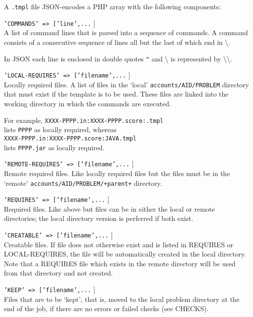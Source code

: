 \documentclass[12pt]{article}
\newenvironment{indpar}[1][0.4in]%
	{\begin{list}{}%
		     {\setlength{\itemsep}{0in}%
		      \setlength{\topsep}{0in}%
		      \setlength{\parsep}{1ex}%
		      \setlength{\labelwidth}{#1}%
		      \setlength{\leftmargin}{#1}%
		      \addtolength{\leftmargin}{\labelsep}}%
	 \item}%
	{\end{list}}
\newenvironment{itemlist}[1][0.2in]%
	{\begin{list}{}{\setlength{\labelwidth}{#1}%
		        \setlength{\leftmargin}{\labelwidth}%
		        \addtolength{\leftmargin}{+0.2in}%
		        \addtolength{\linewidth}{-\labelwidth}%
		        \addtolength{\linewidth}{-0.2in}%
		        \renewcommand{\makelabel}[1]{##1\hfill}}
	 \raggedright}%
	{\end{list}}
\newcommand{\BSL}{\textbackslash}
\begin{document}
A {\tt .tmpl} file JSON-encodes a PHP array with the following
components:
\begin{indpar}[0.2in]
\begin{itemlist}
\item[\tt 'COMMANDS' => ['line',...]] ~
\label{TEMPLATE-COMMANDS} \\
A list of command lines that is parsed into a sequence of commands.
A command consists of a consecutive sequence of lines all but the
last of which end in \BSL.

In JSON each line is enclosed in double quotes \verb|"| and \BSL
is represented by \BSL\BSL.

\item[\tt 'LOCAL-REQUIRES' => ['filename',...]] ~ \\
Locally required files.
A list of files in the `local' {\tt accounts/AID/PROBLEM} directory that must
exist if the template is to be used.  These files
are linked into the working directory in which
the commands are executed.

For example, {\tt XXXX-PPPP.in:XXXX-PPPP.score:.tmpl} \\
lists {\tt PPPP} as locally required, whereas \\
{\tt XXXX-PPPP.in:XXXX-PPPP.score:JAVA.tmpl} \\
lists {\tt PPPP.jar} as locally required.


\item[\tt 'REMOTE-REQUIRES' => ['filename',...]] ~ \\
Remote required files.  Like locally required files but the
files must be in the `remote'
{\tt accounts/AID/PROBLEM/+parent+} directory.

\item[\tt 'REQUIRES' => ['filename',...]] ~ \\
Required files.  Like above but files can be in either the local
or remote directories; the local directory version is perferred if
both exist.

\item[\tt 'CREATABLE' => ['filename',...]] ~ \\
Creatable files.  If file does not otherwise exist and is
listed in REQUIRES or LOCAL-REQUIRES, the file will be automatically
created in the local directory.  Note that a REQUIRES file which
exists in the remote directory will be used from that directory
and not created.

\item[\tt 'KEEP' => ['filename',...]] ~ \\
Files that are to be `kept', that is, moved to the local problem
directory at the end of the job, if there are no errors or failed
checks (see CHECKS).


\end{itemlist}
\end{indpar}
\end{document}
